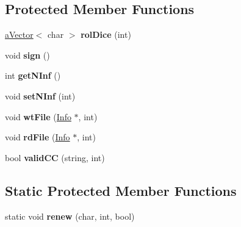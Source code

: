 \subsection*{Protected Member Functions}
\begin{DoxyCompactItemize}
\item 
\hypertarget{class_player_a391f0c68fe2c4c447cad450696b6a635}{}\hyperlink{classa_vector}{a\+Vector}$<$ char $>$ {\bfseries rol\+Dice} (int)\label{class_player_a391f0c68fe2c4c447cad450696b6a635}

\item 
\hypertarget{class_player_a0040cf1aaccc194845c2b41bec062248}{}void {\bfseries sign} ()\label{class_player_a0040cf1aaccc194845c2b41bec062248}

\item 
\hypertarget{class_player_aed39d90aa1fc67c634a3c39711311067}{}int {\bfseries get\+N\+Inf} ()\label{class_player_aed39d90aa1fc67c634a3c39711311067}

\item 
\hypertarget{class_player_aff6552271f8ee023f5a20dfe72877647}{}void {\bfseries set\+N\+Inf} (int)\label{class_player_aff6552271f8ee023f5a20dfe72877647}

\item 
\hypertarget{class_player_a3dd831a23b52bbea2f77fe40b0de23e6}{}void {\bfseries wt\+File} (\hyperlink{struct_info}{Info} $\ast$, int)\label{class_player_a3dd831a23b52bbea2f77fe40b0de23e6}

\item 
\hypertarget{class_player_acaf05123cef3c79f116077df641b91bb}{}void {\bfseries rd\+File} (\hyperlink{struct_info}{Info} $\ast$, int)\label{class_player_acaf05123cef3c79f116077df641b91bb}

\item 
\hypertarget{class_player_abe7e1ad07be484fcb33342c4d00d6f2c}{}bool {\bfseries valid\+C\+C} (string, int)\label{class_player_abe7e1ad07be484fcb33342c4d00d6f2c}

\end{DoxyCompactItemize}
\subsection*{Static Protected Member Functions}
\begin{DoxyCompactItemize}
\item 
\hypertarget{class_player_ada4b9f7e789e35b7ed9a76d3ddefd33d}{}static void {\bfseries renew} (char, int, bool)\label{class_player_ada4b9f7e789e35b7ed9a76d3ddefd33d}

\end{DoxyCompactItemize}
